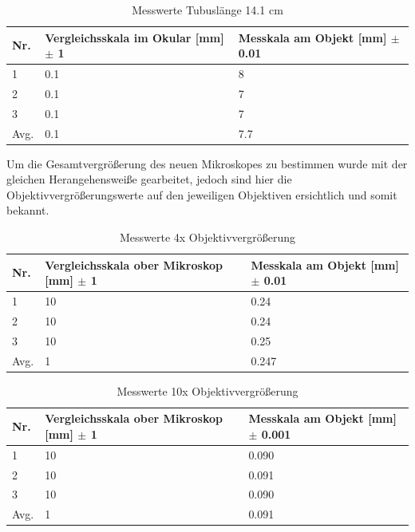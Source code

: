 \documentclass[12pt,a4paper,twoside]{article}
\begin{document}
\begin{table}[H]
    \centering
    \caption{Messwerte Tubuslänge 14.1 cm}
    \label{tab:10XmesswerteTB14}
    \begin{tabular}{| l | l | l |}
        \hline
        Nr.   & Vergleichsskala im Okular [mm] $\pm$ 1 & Messkala am Objekt [mm] $\pm$ 0.01 \\
        \hline
        1 & 0.1 & 8 \\
        2 & 0.1 & 7 \\
        3 & 0.1 & 7 \\
        \hline
        Avg. & 0.1 & 7.7 \\
        \hline
    \end{tabular}
\end{table}

\noindent
Um die Gesamtvergrößerung des neuen Mikroskopes zu bestimmen wurde mit der gleichen Herangehensweiße gearbeitet, jedoch sind hier die Objektivvergrößerungswerte auf den jeweiligen Objektiven ersichtlich und somit bekannt. 

\begin{table}[H]
    \centering
    \caption{Messwerte 4x Objektivvergrößerung}
    \label{tab:messwerteNM4x}
    \begin{tabular}{| l | l | l |}
        \hline
        Nr.   & Vergleichsskala ober Mikroskop [mm] $\pm$ 1 & Messkala am Objekt [mm] $\pm$ 0.01 \\
        \hline
        1 & 10 & 0.24 \\
        2 & 10 & 0.24 \\
        3 & 10 & 0.25 \\
        \hline
        Avg. & 1 & 0.247 \\
        \hline
    \end{tabular}
\end{table}

\begin{table}[H]
    \centering
    \caption{Messwerte 10x Objektivvergrößerung}
    \label{tab:messwerteNM10x}
    \begin{tabular}{| l | l | l |}
        \hline
        Nr.   & Vergleichsskala ober Mikroskop [mm] $\pm$ 1 & Messkala am Objekt [mm] $\pm$ 0.001 \\
        \hline
        1 & 10 & 0.090 \\
        2 & 10 & 0.091 \\
        3 & 10 & 0.090 \\
        \hline
        Avg. & 1 & 0.091 \\
        \hline
    \end{tabular}
\end{table}
\end{document}
